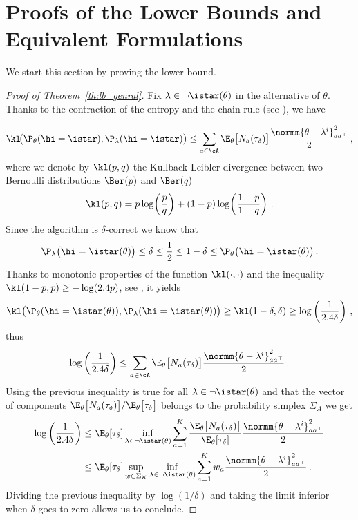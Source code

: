 \section{Proofs of the Lower Bounds and Equivalent Formulations}\label{app:lgc.lower_bound}

We start this section by proving the lower bound.

\begin{proof}[Proof of Theorem~\ref{th:lb_genral}]
Fix $\lambda\in\neg\istar(\theta)$ in the alternative of $\theta$. Thanks to the contraction of the entropy and the chain rule (see \citealt{garivier2018explore}), we have

\[
\kl\!\big(\P_\theta(\hi = \istar),\P_\lambda(\hi = \istar)\big) \leq \sum_{a\in\cA} \E_\theta\big[N_a(\tau_\delta)\big]\frac{\normm{\theta -\lambda^i}_{a a^\top}^2}{2}\,,
\]
where we denote by $\kl(p,q)$ the Kullback-Leibler divergence between two Bernoulli distributions $\Ber(p)$ and $\Ber(q)$
\[
\kl(p,q) = p \log\!\left(\frac{p}{q}\right) + (1-p) \log\!\left(\frac{1-p}{1-q}\right)\,.
\]
Since the algorithm is $\delta$-correct we know that
\[
\P_\lambda\big(\hi = \istar(\theta)\big) \leq \delta \leq \frac{1}{2} \leq  1-\delta \leq \P_\theta\big(\hi = \istar(\theta)\big)\,.
\]
Thanks to monotonic properties of the function $\kl(\cdot,\cdot)$ and the inequality $\kl(1-p,p) \geq -\log(2.4p)$, see \citet{garivier2018explore}, it yields
\[
\kl\big(\P_\theta(\hi = \istar(\theta)),\P_\lambda(\hi = \istar(\theta))\big) \geq \kl(1-\delta,\delta) \geq \log\left(\frac{1}{2.4\delta}\right)\,,
\]
thus
\[
\log\left(\frac{1}{2.4\delta}\right) \leq \sum_{a\in\cA} \E_\theta\big[N_a(\tau_\delta)\big]\frac{\normm{\theta -\lambda^i}_{a a^\top}^2}{2}\,.
\]
Using the previous inequality is true for all $\lambda\in\neg\istar(\theta)$ and that the vector of components $\E_\theta\big[N_a(\tau_\delta)\big]/\E_\theta\big[\tau_\delta\big]$ belongs to the probability simplex $\Sigma_A$ we get
\begin{align*}
\log\left(\frac{1}{2.4\delta}\right) &\leq \E_\theta[\tau_\delta] \inf_{\lambda\in\neg \istar(\theta)} \sum_{a=1}^K \frac{\E_\theta\big[N_a(\tau_\delta)\big]}{\E_\theta[\tau_\delta]}\frac{\normm{\theta -\lambda^i}_{a a^\top}^2}{2}\\ &\leq \E_\theta[\tau_\delta] \sup_{w\in\Sigma_K}
\inf_{\lambda\in\neg \istar(\theta)} \sum_{a=1}^K w_a\frac{\normm{\theta -\lambda^i}_{a a^\top}^2}{2}\,.
\end{align*}
Dividing the previous inequality by $\log(1/\delta)$ and taking the limit inferior when $\delta$ goes to zero allows us to conclude.
\end{proof}

